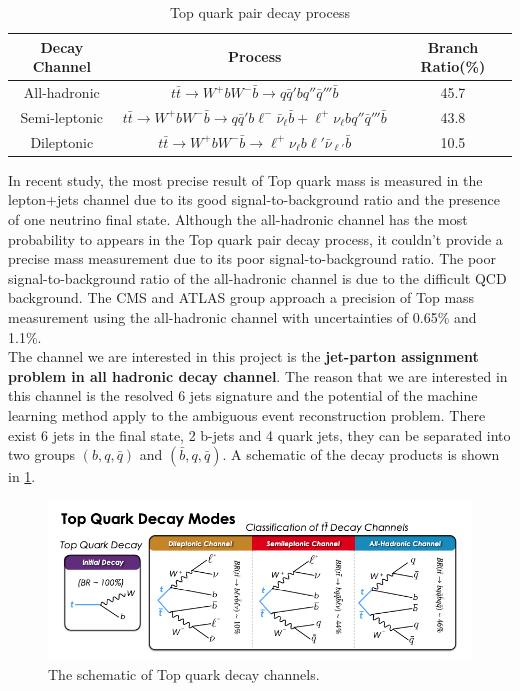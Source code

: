 \begin{center}
\begin{table}[h]
\begin{tabular}{ c c c}
	\cline{1-3}
	Decay Channel    & Process & Branch Ratio(\%) \\
	\hline
	All-hadronic      & $t\bar{t}\to W^{+}bW^{-}\bar{b}\to q\bar{q}'bq''\bar{q}'''\bar{b}$    & 45.7     \\
	Semi-leptonic       &   $t\bar{t}\to W^{+}bW^{-}\bar{b}\to q\bar{q}'b\ell^{-}\bar{\nu}_{\ell}\bar{b} + \ell^{+}\nu_{\ell}bq''\bar{q}'''\bar{b}$   & 43.8     \\
	Dileptonic      &   $t\bar{t}\to W^{+}bW^{-}\bar{b}\to \ell^{+}\nu_{\ell}b\ell'\bar{\nu}_{\ell'}\bar{b}$   & 10.5      \\
	\hline
\end{tabular}
\caption{Top quark pair decay process\cite{Zyla:2020zbs}}
\label{table:Branchratio}
\end{table}
\end{center}
In recent study, the most precise result of Top quark mass is measured in the lepton+jets channel due to its good signal-to-background ratio and the presence of one neutrino final state.\cite{Mccarthy:2015ucy} Although the all-hadronic channel has the most probability to appears in the Top quark pair decay process, it couldn't provide a precise mass measurement due to its poor signal-to-background ratio. The poor signal-to-background ratio of the all-hadronic channel is due to the difficult QCD background. The CMS and ATLAS group approach a precision of Top mass measurement using the all-hadronic channel with uncertainties of 0.65\% and 1.1\%.\cite{Sirunyan:2018mlv}\cite{Aaboud:2017mae} 
\\
\newline
The channel we are interested in this project is the \textbf{jet-parton assignment problem in all hadronic decay channel}. The reason that we are interested in this channel is the resolved 6 jets signature and the potential of the machine learning method apply to the ambiguous event reconstruction problem. There exist 6 jets in the final state, 2 b-jets and 4 quark jets, they can be separated into two groups $\left(b, q, \bar{q}\right)$ and $\left(\bar{b}, q, \bar{q}\right)$. A schematic of the decay products is shown in \ref{fig:ttbardecaymode}. 
\begin{figure}[h]
	\centering
	\includegraphics[width=0.8\linewidth]{Figures/ttbar-decay-mode.png}
	\caption{The schematic of Top quark decay channels.\cite{Mccarthy:2015ucy}}
	\label{fig:ttbardecaymode}
\end{figure}
